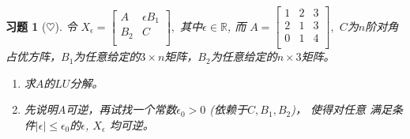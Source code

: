 \documentclass[UTF8]{ctexart}
\newtheorem{ex}[thm]{习题}
\begin{document}
\begin{ex}[$\heartsuit $]
令
$
X_{\epsilon}=\begin{bmatrix}
A& \epsilon B_1\\
 B_2 &C\\
\end{bmatrix}
,
$
其中$\epsilon \in \mathbb{R}$, 而%
$
A=\begin{bmatrix}
1&2 &3 \\
2&1 &3\\
0&1&4\\
\end{bmatrix},
$
$C$为$n$阶对角占优方阵，$B_1$为任意给定的$3\times n$矩阵，$B_2$为任意给定的$n\times 3$矩阵。
\begin{enumerate}
	\item  求$A$的$LU$分解。
	\item  先说明$A$可逆，再试找一个常数$\epsilon_0 > 0$ (依赖于$C, B_1,B_2$)， 使得对任意 满足条件$   |\epsilon|\leq \epsilon_0 $的$\epsilon$, $X_\epsilon$ 均可逆。
\end{enumerate}
\end{ex}
\end{document}
